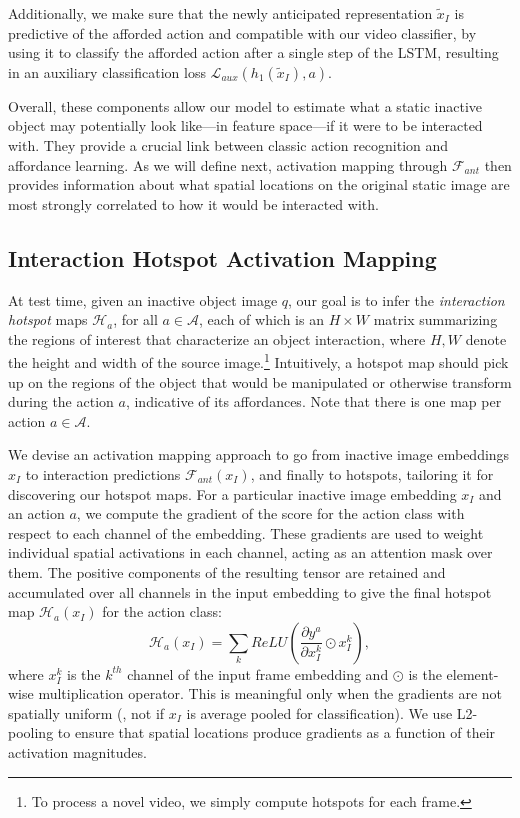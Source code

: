 \documentclass[10pt,twocolumn,letterpaper]{article}
\begin{document}
Additionally, we make sure that the newly anticipated representation $\widetilde{x}_I$ is predictive of the afforded action and compatible with our video classifier, by using it to classify the afforded action after a single step of the LSTM, resulting in an auxiliary classification loss $\mathcal{L}_{aux}(h_1(\widetilde{x}_I),a)$.


Overall, these components allow our model to estimate what a static inactive object may potentially look like---in feature space---if it were to be interacted with. They provide a crucial link between classic action recognition and affordance learning.  As we will define next,  activation mapping through $\mathcal{F}_{ant}$ then provides information about what spatial locations on the original static image are most strongly correlated to how it would be interacted with.


\subsection{Interaction Hotspot Activation Mapping}\label{sec:hotspot_modifications}


At test time, given an inactive object image $q$, 
our goal is to infer the \emph{interaction hotspot} maps $\mathcal{H}_a$, for all $a \in \mathcal{A}$, each of which is an $H \times W$ matrix summarizing the regions of interest that characterize an object interaction, where $H, W$ denote the height and width of the source image.\footnote{To process a novel video, we simply compute hotspots for each frame.} 
Intuitively, a hotspot map should pick up on the regions of the object that would be manipulated or otherwise transform during the action $a$, indicative of its affordances. Note that there is one map per action $a \in \mathcal{A}$.  


We devise an activation mapping approach to go from inactive image embeddings $x_I$ to interaction predictions $\mathcal{F}_{ant}(x_I)$, and finally to hotspots, tailoring it for discovering our hotspot maps. 
For a particular inactive image embedding $x_I$ and an action $a$, we compute the gradient of the score for the action class with respect to each channel of the embedding. These gradients are used to weight individual spatial activations in each channel, acting as an attention mask over them. The positive components of the resulting tensor are retained and accumulated over all channels in the input embedding to give the final hotspot map $\mathcal{H}_a(x_{I})$ for the action class: 
\begin{equation}
    \mathcal{H}_a(x_{I}) = \sum_k ReLU\left(\frac{\partial y^a}{\partial  x_I^k} \odot x_I^k\right),
\label{eq:gradcam1}
\end{equation}
where $x_I^k$ is the $k^{th}$ channel of the input frame embedding and $\odot$ is the element-wise multiplication operator. 
This is meaningful only when the gradients are not spatially uniform (\eg, not if $x_I$ is average pooled for classification). We use L2-pooling to ensure that spatial locations produce gradients as a function of their activation magnitudes.
\end{document}
